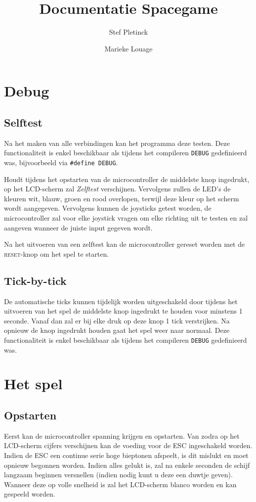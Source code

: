 \documentclass[a4paper]{article}
\title{Documentatie Spacegame}
\author{Stef Pletinck \and Marieke Louage}
\begin{document}
\maketitle

\section{Debug}
\subsection{Selftest}
Na het maken van alle verbindingen kan het programma deze testen. Deze
functionaliteit is enkel beschikbaar als tijdens het compileren \texttt{DEBUG}
gedefinieerd was, bijvoorbeeld via \texttt{\#{}define DEBUG}.

Houdt tijdens het opstarten van de microcontroller de middelste knop ingedrukt,
op het LCD-scherm zal \emph{Zelftest} verschijnen. Vervolgens zullen de LED's de
kleuren wit, blauw, groen en rood overlopen, terwijl deze kleur op het scherm
wordt aangegeven. Vervolgens kunnen de joysticks getest worden, de
microcontroller zal voor elke joystick vragen om elke richting uit te testen en
zal aangeven wanneer de juiste input gegeven wordt.

Na het uitvoeren van een zelftest kan de microcontroller gereset worden met de
\textsc{reset}-knop om het spel te starten.

\subsection{Tick-by-tick}
De automatische ticks kunnen tijdelijk worden uitgeschakeld door tijdens het
uitvoeren van het spel de middelste knop ingedrukt te houden voor minstens 1
seconde. Vanaf dan zal er bij elke druk op deze knop 1 tick verstrijken. Na
opnieuw de knop ingedrukt houden gaat het spel weer naar normaal. Deze
functionaliteit is enkel beschikbaar als tijdens het compileren \texttt{DEBUG}
gedefinieerd was.

\section{Het spel}
\subsection{Opstarten}
Eerst kan de microcontroller spanning krijgen en opstarten. Van zodra op het
LCD-scherm cijfers verschijnen kan de voeding voor de ESC ingeschakeld worden.
Indien de ESC een continue serie hoge bieptonen afspeelt, is dit mislukt en moet
opnieuw begonnen worden. Indien alles gelukt is, zal na enkele seconden de
schijf langzaam beginnen versnellen (indien nodig kunt u deze een duwtje geven).
Wanneer deze op volle snelheid is zal het LCD-scherm blanco worden en kan
gespeeld worden.
\end{document}
